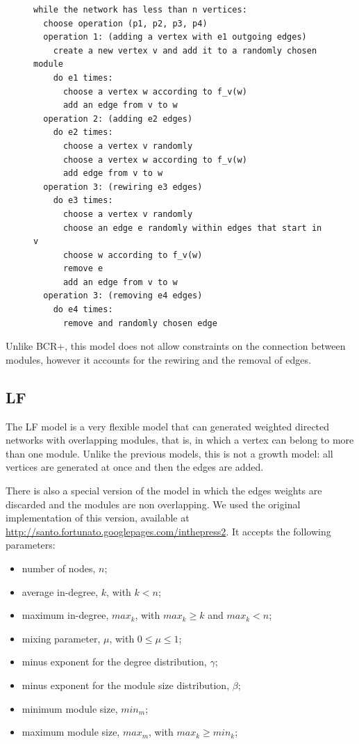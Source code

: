 \begin{figure}
\begin{verbatim}
while the network has less than n vertices:
  choose operation (p1, p2, p3, p4)
  operation 1: (adding a vertex with e1 outgoing edges)
    create a new vertex v and add it to a randomly chosen module
    do e1 times:
      choose a vertex w according to f_v(w)
      add an edge from v to w
  operation 2: (adding e2 edges)
    do e2 times:
      choose a vertex v randomly
      choose a vertex w according to f_v(w)
      add edge from v to w
  operation 3: (rewiring e3 edges)
    do e3 times:
      choose a vertex v randomly
      choose an edge e randomly within edges that start in v
      choose w according to f_v(w)
      remove e
      add an edge from v to w
  operation 3: (removing e4 edges)
    do e4 times:
      remove and randomly chosen edge
\end{verbatim}
\end{figure}

Unlike BCR+, this model does not allow constraints on the connection between
modules, however it accounts for the rewiring and the removal of edges. 

\subsection{LF}

The LF model \cite{Lancichinetti2009} is a very flexible model that can
generated weighted directed networks with overlapping modules, that is, in which
a vertex can belong to more than one module. Unlike the previous models, this is
not a growth model: all vertices are generated at once and then the edges are
added.

There is also a special version of the model in which the edges weights are
discarded and the modules are non overlapping. We used the original
implementation of this version, available at
\url{http://santo.fortunato.googlepages.com/inthepress2}. It accepts the following
parameters:

\begin{itemize}
\item number of nodes, $n$;
\item average in-degree, $k$, with $k < n$;
\item maximum in-degree, $max_k$, with $max_k \ge k$ and $max_k < n$;
\item mixing parameter, $\mu$, with $0 \le \mu \le 1$;
\item minus exponent for the degree distribution, $\gamma$;
\item minus exponent for the module size distribution, $\beta$;
\item minimum module size, $min_m$;
\item maximum module size, $max_m$, with $max_k \ge min_k$;
\end{itemize}

